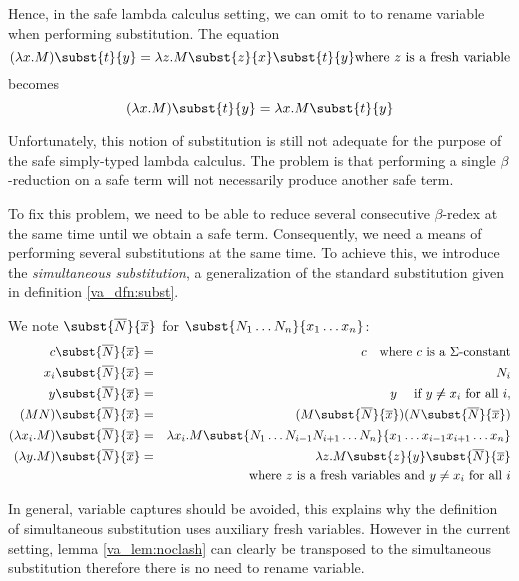 Hence, in the safe lambda calculus setting, we can omit to
to rename variable when performing substitution. The equation
$$(\lambda x . M) \subst{t}{y} = \lambda z . M \subst{z}{x}
\subst{t}{y} \mbox{where $z$ is a fresh variable}$$
becomes
$$(\lambda x . M) \subst{t}{y} = \lambda x . M \subst{t}{y}$$



Unfortunately, this notion of substitution is still not adequate for
the purpose of the safe simply-typed lambda calculus. The problem is
that performing a single $\beta$-reduction on a safe term will not
necessarily produce another safe term.

To fix this problem, we need to be able to reduce several
consecutive $\beta$-redex at the same time until we obtain a safe
term. Consequently, we need a means of performing several
substitutions at the same time. To achieve this, we introduce the
\emph{simultaneous substitution},
 a generalization of the standard substitution given in definition \ref{va_dfn:subst}.

\begin{dfn}
 We note $\subst{\overline{N}}{\overline{x}}$ for $\subst{N_1 \ldots N_n}{x_1
\ldots x_n}$:
\begin{eqnarray*}
c \subst{\overline{N}}{\overline{x}} &=& c \quad \mbox{where $c$ is a $\Sigma$-constant}\\
x_i \subst{\overline{N}}{\overline{x}} &=& N_i\\
 y \subst{\overline{N}}{\overline{x}} &=& y \quad \mbox{ if } y \not \neq x_i \mbox{ for all } i,\\
(M N) \subst{\overline{N}}{\overline{x}} &=& (M \subst{\overline{N}}{\overline{x}}) (N \subst{\overline{N}}{\overline{x}}) \\
(\lambda x_i . M) \subst{\overline{N}}{\overline{x}} &=& \lambda x_i . M
\subst{N_1 \ldots N_{i-1} N_{i+1}\ldots N_n}{x_1 \ldots x_{i-1} x_{i+1}\ldots x_n} \\
(\lambda y . M)
\subst{\overline{N}}{\overline{x}} &=& \lambda z . M \subst{z}{y} \subst{\overline{N}}{\overline{x}} \\
&& \mbox{where $z$ is a fresh variables and } y \neq x_i \mbox{ for all } i
\end{eqnarray*}
\end{dfn}

In general, variable captures should be avoided, this explains why the definition
of simultaneous substitution uses auxiliary fresh variables.
However in the current setting, lemma \ref{va_lem:noclash} can clearly be transposed to
the simultaneous substitution therefore there is no need to rename variable.

